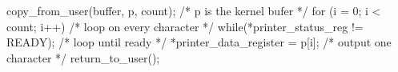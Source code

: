 \documentclass[varwidth=35em,crop]{standalone}
\begin{document}
\begin{ccode}
copy_from_user(buffer, p, count);        /* p is the kernel bufer */
for (i = 0; i < count; i++) {            /* loop on every character */
    while(*printer_status_reg != READY); /* loop until ready */
    *printer_data_register = p[i];       /* output one character */
}
return_to_user();
\end{ccode}
\end{document}
